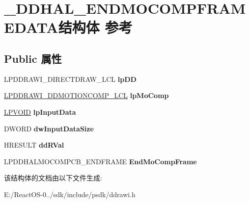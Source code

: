 \hypertarget{struct___d_d_h_a_l___e_n_d_m_o_c_o_m_p_f_r_a_m_e_d_a_t_a}{}\section{\+\_\+\+D\+D\+H\+A\+L\+\_\+\+E\+N\+D\+M\+O\+C\+O\+M\+P\+F\+R\+A\+M\+E\+D\+A\+T\+A结构体 参考}
\label{struct___d_d_h_a_l___e_n_d_m_o_c_o_m_p_f_r_a_m_e_d_a_t_a}
\subsection*{Public 属性}
\begin{DoxyCompactItemize}
\item 
\mbox{\label{struct___d_d_h_a_l___e_n_d_m_o_c_o_m_p_f_r_a_m_e_d_a_t_a_a71ab4dc1889ad974b1434ac6bff978d3}} 
L\+P\+D\+D\+R\+A\+W\+I\+\_\+\+D\+I\+R\+E\+C\+T\+D\+R\+A\+W\+\_\+\+L\+CL {\bfseries lp\+DD}
\item 
\mbox{\label{struct___d_d_h_a_l___e_n_d_m_o_c_o_m_p_f_r_a_m_e_d_a_t_a_ac7b1f5bd897d70a987a1d679061a33af}} 
\hyperlink{struct___d_d_r_a_w_i___d_d_m_o_t_i_o_n_c_o_m_p___l_c_l}{L\+P\+D\+D\+R\+A\+W\+I\+\_\+\+D\+D\+M\+O\+T\+I\+O\+N\+C\+O\+M\+P\+\_\+\+L\+CL} {\bfseries lp\+Mo\+Comp}
\item 
\mbox{\label{struct___d_d_h_a_l___e_n_d_m_o_c_o_m_p_f_r_a_m_e_d_a_t_a_a303fd1de9aa1d2ec549143ae4b934784}} 
\hyperlink{interfacevoid}{L\+P\+V\+O\+ID} {\bfseries lp\+Input\+Data}
\item 
\mbox{\label{struct___d_d_h_a_l___e_n_d_m_o_c_o_m_p_f_r_a_m_e_d_a_t_a_ae29d102c37bb40545c4533f328432091}} 
D\+W\+O\+RD {\bfseries dw\+Input\+Data\+Size}
\item 
\mbox{\label{struct___d_d_h_a_l___e_n_d_m_o_c_o_m_p_f_r_a_m_e_d_a_t_a_a8d44321f81b394484c583a2403e0ca27}} 
H\+R\+E\+S\+U\+LT {\bfseries dd\+R\+Val}
\item 
\mbox{\label{struct___d_d_h_a_l___e_n_d_m_o_c_o_m_p_f_r_a_m_e_d_a_t_a_ae1700018bcf5f5819fd62ebd33380d68}} 
L\+P\+D\+D\+H\+A\+L\+M\+O\+C\+O\+M\+P\+C\+B\+\_\+\+E\+N\+D\+F\+R\+A\+ME {\bfseries End\+Mo\+Comp\+Frame}
\end{DoxyCompactItemize}


该结构体的文档由以下文件生成\+:\begin{DoxyCompactItemize}
\item 
E\+:/\+React\+O\+S-\/0../sdk/include/psdk/ddrawi.\+h\end{DoxyCompactItemize}
